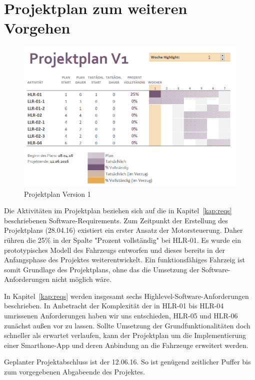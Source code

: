 \documentclass[a4paper,12pt]{article}                                         %
\numberwithin{table}{section}                               %
\numberwithin{figure}{section}                              %
\renewcommand{\thetable}{\arabic{section}.\arabic{table}}   %
\renewcommand{\thefigure}{\arabic{section}.\arabic{figure}} %
\begin{document}
	\newpage
	\section{Projektplan zum weiteren Vorgehen}
	
		\begin{figure}[h]
			\begin{center}
				\includegraphics[scale=0.8]{../Bilder/PlanV1.png}
			\end{center}
			\caption{Projektplan Version 1}
		\end{figure}
		
	Die Aktivitäten im Projektplan beziehen sich auf die in Kapitel~\ref{kap:reqs} beschriebenen Software-Requirements. Zum Zeitpunkt der Erstellung des Projektplans (28.04.16) existiert ein erster Ansatz der Motorsteuerung. Daher rühren die 25\% in der Spalte "Prozent vollständig" bei HLR-01. Es wurde ein prototypisches Modell des Fahrzeugs entworfen und dieses bereits in der Anfangsphase des Projektes weiterentwickelt. Ein funktionsfähiges Fahrzeig ist somit Grundlage des Projektplans, ohne das die Umsetzung der Software-Anforderungen nicht möglich wäre. 
	
	\bigskip
	In Kapitel~\ref{kap:reqs} werden insgesamt sechs Highlevel-Software-Anforderungen beschrieben. In Anbetracht der Komplexität der in HLR-01 bis HLR-04 umrissenen Anforderungen haben wir uns entschieden, HLR-05 und HLR-06 zunächst außen vor zu lassen. Sollte Umsetzung der Grundfunktionalitäten doch schneller als erwartet verlaufen, kann der Projektplan um die Implementierung einer Smarthone-App und deren Anbindung an die Fahrzeuge erweitert werden.
	
	\bigskip
	Geplanter Projektabschluss ist der 12.06.16. So ist genügend zeitlicher Puffer bis zum vorgegebenen Abgabeende des Projektes. 
		
	\renewcommand{\thetable}{\Alph{section}.\arabic{table}}              %
	\renewcommand{\thefigure}{\Alph{section}.\arabic{figure}}            %
	\renewcommand{\thelstlisting}{\Alph{section}.\arabic{lstlisting}}    %
	
	\begin{appendix}
	\end{appendix}
	
	
	
	
\end{document}
